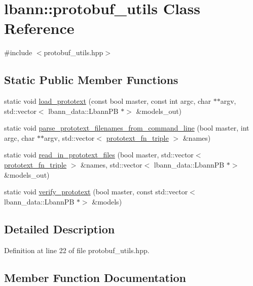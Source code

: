 \hypertarget{classlbann_1_1protobuf__utils}{}\section{lbann\+:\+:protobuf\+\_\+utils Class Reference}
\label{classlbann_1_1protobuf__utils}


{\ttfamily \#include $<$protobuf\+\_\+utils.\+hpp$>$}

\subsection*{Static Public Member Functions}
\begin{DoxyCompactItemize}
\item 
static void \hyperlink{classlbann_1_1protobuf__utils_ad85c0f279c98fad3f9e9e6c54786acf1}{load\+\_\+prototext} (const bool master, const int argc, char $\ast$$\ast$argv, std\+::vector$<$ lbann\+\_\+data\+::\+Lbann\+PB $\ast$$>$ \&models\+\_\+out)
\item 
static void \hyperlink{classlbann_1_1protobuf__utils_a690c56a9ac8bcbc883751355b53e0006}{parse\+\_\+prototext\+\_\+filenames\+\_\+from\+\_\+command\+\_\+line} (bool master, int argc, char $\ast$$\ast$argv, std\+::vector$<$ \hyperlink{structlbann_1_1prototext__fn__triple}{prototext\+\_\+fn\+\_\+triple} $>$ \&names)
\item 
static void \hyperlink{classlbann_1_1protobuf__utils_ab8470c35e353af71b04e1e853b99f8ae}{read\+\_\+in\+\_\+prototext\+\_\+files} (bool master, std\+::vector$<$ \hyperlink{structlbann_1_1prototext__fn__triple}{prototext\+\_\+fn\+\_\+triple} $>$ \&names, std\+::vector$<$ lbann\+\_\+data\+::\+Lbann\+PB $\ast$$>$ \&models\+\_\+out)
\item 
static void \hyperlink{classlbann_1_1protobuf__utils_a058d524e15fb811e0d193ffb308c5faf}{verify\+\_\+prototext} (bool master, const std\+::vector$<$ lbann\+\_\+data\+::\+Lbann\+PB $\ast$$>$ \&models)
\end{DoxyCompactItemize}


\subsection{Detailed Description}


Definition at line 22 of file protobuf\+\_\+utils.\+hpp.



\subsection{Member Function Documentation}
\mbox{\label{classlbann_1_1protobuf__utils_ad85c0f279c98fad3f9e9e6c54786acf1}} 
